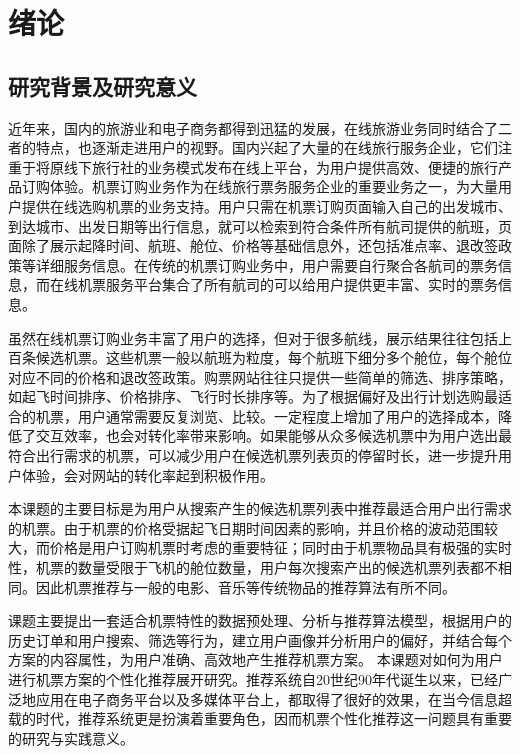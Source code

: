 
\chapter{绪论 }
\label{chap:intro}


\section{研究背景及研究意义}
近年来，国内的旅游业和电子商务都得到迅猛的发展，在线旅游业务同时结合了二者的特点，也逐渐走进用户的视野。国内兴起了大量的在线旅行服务企业，它们注重于将原线下旅行社的业务模式发布在线上平台，为用户提供高效、便捷的旅行产品订购体验。机票订购业务作为在线旅行票务服务企业的重要业务之一，为大量用户提供在线选购机票的业务支持。用户只需在机票订购页面输入自己的出发城市、到达城市、出发日期等出行信息，就可以检索到符合条件所有航司提供的航班，页面除了展示起降时间、航班、舱位、价格等基础信息外，还包括准点率、退改签政策等详细服务信息。在传统的机票订购业务中，用户需要自行聚合各航司的票务信息，而在线机票服务平台集合了所有航司的可以给用户提供更丰富、实时的票务信息。

虽然在线机票订购业务丰富了用户的选择，但对于很多航线，展示结果往往包括上百条候选机票。这些机票一般以航班为粒度，每个航班下细分多个舱位，每个舱位对应不同的价格和退改签政策。购票网站往往只提供一些简单的筛选、排序策略，如起飞时间排序、价格排序、飞行时长排序等。为了根据偏好及出行计划选购最适合的机票，用户通常需要反复浏览、比较。一定程度上增加了用户的选择成本，降低了交互效率，也会对转化率带来影响。如果能够从众多候选机票中为用户选出最符合出行需求的机票，可以减少用户在候选机票列表页的停留时长，进一步提升用户体验，会对网站的转化率起到积极作用。

本课题的主要目标是为用户从搜索产生的候选机票列表中推荐最适合用户出行需求的机票。由于机票的价格受据起飞日期时间因素的影响，并且价格的波动范围较大，而价格是用户订购机票时考虑的重要特征；同时由于机票物品具有极强的实时性，机票的数量受限于飞机的舱位数量，用户每次搜索产出的候选机票列表都不相同。因此机票推荐与一般的电影、音乐等传统物品的推荐算法有所不同。



课题主要提出一套适合机票特性的数据预处理、分析与推荐算法模型，根据用户的历史订单和用户搜索、筛选等行为，建立用户画像并分析用户的偏好，并结合每个方案的内容属性，为用户准确、高效地产生推荐机票方案。
本课题对如何为用户进行机票方案的个性化推荐展开研究。推荐系统自20世纪90年代诞生以来，已经广泛地应用在电子商务平台以及多媒体平台上，都取得了很好的效果，在当今信息超载的时代，推荐系统更是扮演着重要角色，因而机票个性化推荐这一问题具有重要的研究与实践意义。




